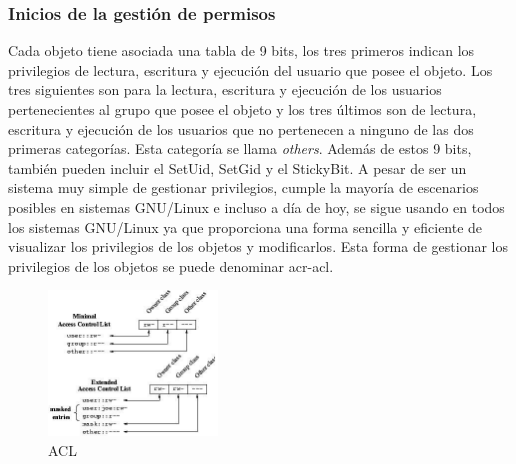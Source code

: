 \documentclass[twoside, titlepage, 12pt, a4paper]{article}
\begin{document}
\subsubsection{Inicios de la gestión de permisos}
Cada objeto tiene asociada una tabla de 9 bits, los tres primeros indican los privilegios de lectura, escritura y ejecución del usuario que posee el objeto. Los tres siguientes son para la lectura, escritura y ejecución de los usuarios pertenecientes al grupo que posee el objeto y los tres últimos son de lectura, escritura y ejecución de los usuarios que no pertenecen a ninguno de las dos primeras categorías. Esta categoría se llama \textit{others}. Además de estos 9 bits, también pueden incluir el \gls{SetUid}, \gls{SetGid} y el \gls{StickyBit}. A pesar de ser un sistema muy simple de gestionar privilegios, cumple la mayoría de escenarios posibles en sistemas \gls{GNU/Linux} e incluso a día de hoy, se sigue usando en todos los sistemas \gls{GNU/Linux} ya que proporciona una forma sencilla y eficiente de visualizar los privilegios de los objetos y modificarlos. Esta forma de gestionar los privilegios de los objetos se puede denominar \gls{acr-acl}.
\begin{figure}[H]
    \centering
    \includegraphics[width=0.4\textwidth]{Media/ACL.jpg}
    \caption{\gls{ACL}}
    \label{fig:ACL}
\end{figure}
\end{document}
